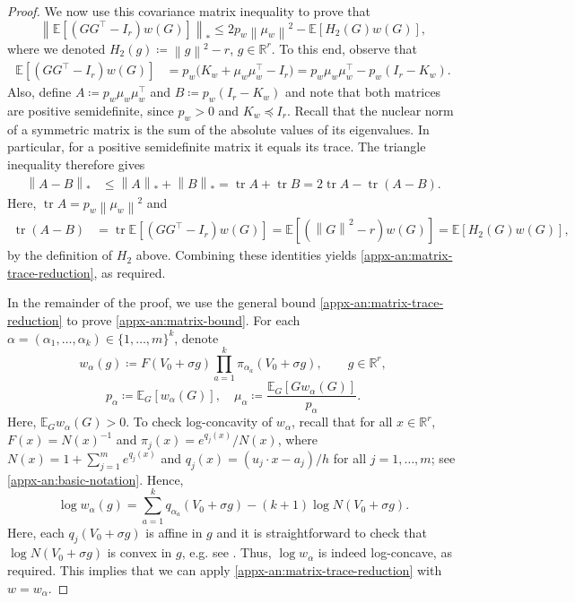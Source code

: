 \documentclass[11pt,letterpaper]{article}
\theoremstyle{remark}
\newcommand{\E}{\mathbb E}
\newcommand{\R}{\mathbb R}
\newcommand{\tr}{\operatorname{tr}}
\newcommand{\norm}[1]{\left\lVert#1\right\rVert}
\begin{document}
\begin{proof}
We now use this covariance matrix inequality to prove that
\begin{equation}
\left\|\E[(GG^\top-I_r)w(G)]\right\|_*
\le 2p_w\norm{\mu_w}^2
 -\E[H_2(G)w(G)],
\label{appx-an:matrix-trace-reduction}
\end{equation}
where we denoted \(H_2(g)\coloneqq\norm g^2-r\), $g\in\R^r$. To this end, observe that
\begin{align*}
\E[(GG^\top-I_r)w(G)]
&=p_w\bigl(K_w+\mu_w\mu_w^\top-I_r\bigr)
=p_w\mu_w\mu_w^\top-p_w(I_r-K_w).
\end{align*}
Also, define $A\coloneqq p_w\mu_w\mu_w^\top$ and $B\coloneqq p_w(I_r-K_w)$ and note that
both matrices are positive semidefinite, since
\(p_w>0\) and \(K_w\preceq I_r\).
Recall that the nuclear norm of a symmetric
matrix is the sum of the absolute values of its
eigenvalues. In particular, for a positive
semidefinite matrix it equals its trace.
The triangle inequality therefore gives
\begin{align*}
\norm{A-B}_*
&\le\norm A_*+\norm B_*
=\tr A+\tr B
=2\tr A-\tr(A-B).
\end{align*}
Here, $\tr A=p_w\norm{\mu_w}^2$ and
\begin{align*}
\tr(A-B)
&=\tr\E[(GG^\top-I_r)w(G)]
=\E[(\norm G^2-r)w(G)]
=\E[H_2(G)w(G)],
\end{align*}
by the definition of $H_2$ above. Combining these identities yields \eqref{appx-an:matrix-trace-reduction}, as required.

In the remainder of the proof, we use the general bound \eqref{appx-an:matrix-trace-reduction} to prove \eqref{appx-an:matrix-bound}. For each \(\alpha=(\alpha_1,\ldots,\alpha_k)\in\{1,\dots,m\}^k\), denote
\[
 w_\alpha(g)\coloneqq F(V_0+\sigma g)
                 \prod_{a=1}^k\pi_{\alpha_a}(V_0+\sigma g),\qquad g\in\R^r,
\]
\[
p_\alpha\coloneqq \E_G[w_\alpha(G)],
 \quad \mu_\alpha\coloneqq \frac{\E_G[Gw_\alpha(G)]}{p_\alpha}.
\]
Here, $\E_Gw_\alpha(G)>0$. To check log-concavity of $w_\alpha$, recall that for all $x\in \R^r$, \(F(x)=N(x)^{-1}\) and \(\pi_j(x)=e^{q_j(x)}/N(x)\), where $N(x) = 1 + \sum_{j=1}^m e^{q_j(x)}$ and $q_j(x) = (u_j\cdot x - a_j) / h$ for all $j=1,\dots, m$; see \eqref{appx-an:basic-notation}. Hence,
\[
 \log w_\alpha(g)
 =\sum_{a=1}^k q_{\alpha_a}(V_0+\sigma g)
  -(k+1)\log N(V_0+\sigma g).
\]
Here, each \(q_j(V_0+\sigma g)\) is affine in \(g\) and it is straightforward to check that \(\log N(V_0+\sigma g)\) is convex in \(g\), e.g. see \cite[Section~3.1.5, pp.~72--74]{BoydVandenberghe2004}. Thus,
\(\log w_\alpha\) is indeed log-concave, as required. This implies that we can apply \eqref{appx-an:matrix-trace-reduction} with $w=w_\alpha$.



\end{proof}
\end{document}
